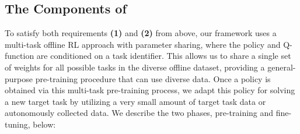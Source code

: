 \vspace{-0.2cm}
\subsection{The Components of \ptrmethodname}
\label{sec:ptr_algorithm}
\vspace{-0.2cm}

To satisfy both requirements \textbf{(1)} and \textbf{(2)} from above, our framework uses a multi-task offline RL approach with parameter sharing, where the policy and Q-function are conditioned on a task identifier. This allows us to share a single set of weights for all possible tasks in the diverse offline dataset, providing a general-purpose pre-training procedure that can use diverse data. 
Once a policy is obtained via this multi-task pre-training process, we adapt this policy for solving a new target task by utilizing a very small amount of target task data or autonomously collected data. We describe the two phases, pre-training and fine-tuning, below:

